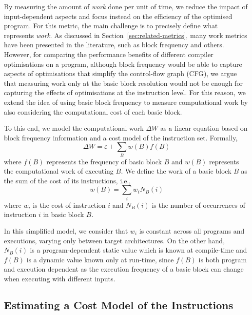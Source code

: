 \documentclass[sigplan,10pt]{acmart}
\theoremstyle{definition}
\begin{document}
By measuring the amount of \textit{work} done per unit of time, we reduce the impact of input-dependent aspects and focus instead on the efficiency of the optimised program.
For this metric, the main challenge is to precisely define what represents \textit{work}.
As discussed in Section~\ref{sec:related-metrics}, many work metrics have been presented in the literature, such as block frequency and others.
However, for comparing the performance benefits of different compiler optimisations on a program, although block frequency would be able to capture aspects of optimisations that simplify the control-flow graph (CFG), we argue that measuring work only at the basic block resolution would not be enough for capturing the effects of optimisations at the instruction level.
For this reason, we extend the idea of using basic block frequency to measure computational work by also considering the computational cost of each basic block.

To this end, we model the computational work $\Delta W$ as a linear equation based on block frequency information and a cost model of the instruction set.
Formally,
\[
\Delta W = \varepsilon + \sum_{B} w(B)f(B)
\]
where $f(B)$ represents the frequency of basic block $B$ and $w(B)$ represents the computational work of executing $B$.
We define the work of a basic block $B$ as the sum of the cost of its instructions, i.e.,
\[
w(B) = \sum_{i} w_i N_B(i)
\]
where $w_i$ is the cost of instruction $i$ and $N_B(i)$ is the number of occurrences of instruction $i$ in basic block $B$.

In this simplified model, we consider that $w_i$ is constant across all programs and executions, varying only between target architectures.
On the other hand, $N_B(i)$ is a program-dependent static value which is known at compile-time and $f(B)$ is a dynamic value known only at run-time,
since $f(B)$ is both program and execution dependent as the execution frequency of a basic block can change when executing with different inputs.

\subsection{Estimating a Cost Model of the Instructions}
\end{document}
